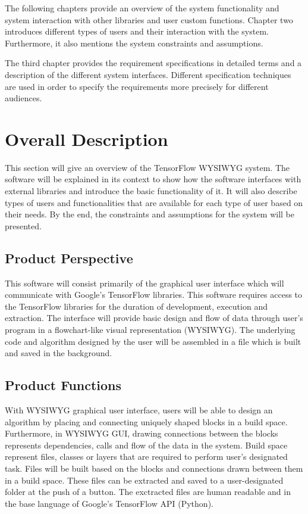 \documentclass[journal,10pt,onecolumn,compsoc]{IEEEtran} \usepackage[margin=1.0in]{geometry} \usepackage{pdfpages} \usepackage{graphicx}
\begin{document}
The following chapters provide an overview of the system functionality and system interaction with other libraries and user custom functions. 
Chapter two introduces different types of users and their interaction with the system. 
Furthermore, it also mentions the system constraints and assumptions.

The third chapter provides the requirement specifications in detailed terms and a description of the different system interfaces. 
Different specification techniques are used in order to specify the requirements more precisely for different audiences.

\newpage

\section{Overall Description}

This section will give an overview of the TensorFlow WYSIWYG system. 
The software will be explained in its context to show how the software interfaces with external libraries and introduce the basic functionality of it. 
It will also describe types of users  and functionalities that are available for each type of user based on their needs. 
By the end, the constraints and assumptions for the system will be presented.

\subsection{Product Perspective}

This software will consist primarily of the graphical user interface which will communicate with Google's TensorFlow libraries. 
This software requires access to the TensorFlow libraries for the duration of development, execution and extraction. 
The interface will provide basic design and flow of data through user's program in a flowchart-like visual representation (WYSIWYG).
The underlying code and algorithm designed by the user will be assembled in a file which is built and saved in the background. 

\subsection{Product Functions}

With WYSIWYG graphical user interface, users will be able to design an algorithm by placing and connecting uniquely shaped blocks in a build space.
Furthermore, in WYSIWYG GUI, drawing connections between the blocks represents dependencies, calls and flow of the data in the system.
Build space represent files, classes or layers that are required to perform user's designated task.
Files will be built based on the blocks and connections drawn between them in a build space.
These files can be extracted and saved to a user-designated folder at the push of a button.
The exctracted files are human readable and in the base language of Google's TensorFlow API (Python).
\end{document}
